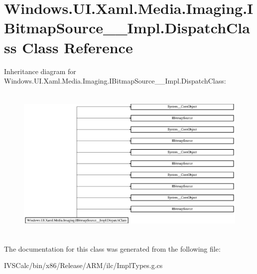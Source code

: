 \hypertarget{class_windows_1_1_u_i_1_1_xaml_1_1_media_1_1_imaging_1_1_i_bitmap_source_____impl_1_1_dispatch_class}{}\section{Windows.\+U\+I.\+Xaml.\+Media.\+Imaging.\+I\+Bitmap\+Source\+\_\+\+\_\+\+Impl.\+Dispatch\+Class Class Reference}
\label{class_windows_1_1_u_i_1_1_xaml_1_1_media_1_1_imaging_1_1_i_bitmap_source_____impl_1_1_dispatch_class}
Inheritance diagram for Windows.\+U\+I.\+Xaml.\+Media.\+Imaging.\+I\+Bitmap\+Source\+\_\+\+\_\+\+Impl.\+Dispatch\+Class\+:\begin{figure}[H]
\begin{center}
\leavevmode
\includegraphics[height=7.549020cm]{class_windows_1_1_u_i_1_1_xaml_1_1_media_1_1_imaging_1_1_i_bitmap_source_____impl_1_1_dispatch_class}
\end{center}
\end{figure}


The documentation for this class was generated from the following file\+:\begin{DoxyCompactItemize}
\item 
I\+V\+S\+Calc/bin/x86/\+Release/\+A\+R\+M/ilc/Impl\+Types.\+g.\+cs\end{DoxyCompactItemize}
